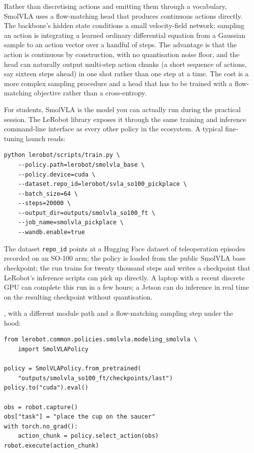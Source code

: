  Rather than discretising actions and emitting them through a vocabulary, SmolVLA uses a flow-matching head that produces continuous actions directly. The backbone's hidden state conditions a small velocity-field network; sampling an action is integrating a learned ordinary differential equation from a Gaussian sample to an action vector over a handful of steps. The advantage is that the action is continuous by construction, with no quantisation noise floor, and the head can naturally output multi-step action chunks (a short sequence of actions, say sixteen steps ahead) in one shot rather than one step at a time. The cost is a more complex sampling procedure and a head that has to be trained with a flow-matching objective rather than a cross-entropy.

 For students, SmolVLA is the model you can actually run during the practical session. The LeRobot library exposes it through the same training and inference command-line interface as every other policy in the ecosystem. A typical fine-tuning launch reads:

\begin{verbatim}
python lerobot/scripts/train.py \
    --policy.path=lerobot/smolvla_base \
    --policy.device=cuda \
    --dataset.repo_id=lerobot/svla_so100_pickplace \
    --batch_size=64 \
    --steps=20000 \
    --output_dir=outputs/smolvla_so100_ft \
    --job_name=smolvla_pickplace \
    --wandb.enable=true
\end{verbatim}

The dataset \verb|repo_id| points at a Hugging Face dataset of teleoperation episodes recorded on an SO-100 arm; the policy is loaded from the public SmolVLA base checkpoint; the run trains for twenty thousand steps and writes a checkpoint that LeRobot's inference scripts can pick up directly. A laptop with a recent discrete GPU can complete this run in a few hours; a Jetson can do inference in real time on the resulting checkpoint without quantisation.

, with a different module path and a flow-matching sampling step under the hood:

\begin{verbatim}
from lerobot.common.policies.smolvla.modeling_smolvla \
    import SmolVLAPolicy

policy = SmolVLAPolicy.from_pretrained(
    "outputs/smolvla_so100_ft/checkpoints/last")
policy.to("cuda").eval()

obs = robot.capture()
obs["task"] = "place the cup on the saucer"
with torch.no_grad():
    action_chunk = policy.select_action(obs)
robot.execute(action_chunk)
\end{verbatim}

